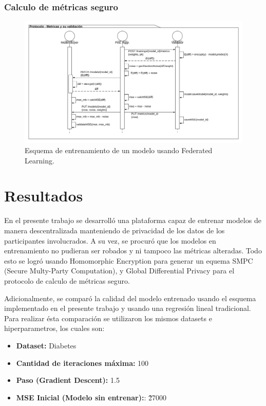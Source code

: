\documentclass[
11pt, %
oneside, %
spanish, %
singlespacing, %
parskip, %
headsepline, %
chapterinoneline, %
]{MastersDoctoralThesis} %
\begin{document}
\subsection*{Calculo de métricas seguro}
\begin{figure}[H]
  	\centering
	\includegraphics[scale=0.1]{imgs/flujo_valid.png}
	\caption{Esquema de entrenamiento de un modelo usando Federated Learning.}
	\label{fig:flujo_valid}
\end{figure}


\chapter{Resultados}

En el presente trabajo se desarrolló una plataforma capaz de entrenar modelos de manera descentralizada manteniendo de privacidad de los datos de los participantes involucrados. A su vez, se procuró que los modelos en entrenamiento no pudieran ser robados y ni tampoco las métricas alteradas. Todo esto se logró usando Homomorphic Encryption para generar un equema SMPC (Secure Multy-Party Computation), y Global Differential Privacy para el protocolo de calculo de métricas seguro.

Adicionalmente, se comparó la calidad del modelo entrenado usando el esquema implementado en el presente trabajo y usando una regresión lineal tradicional. Para realizar ésta comparación se utilizaron los mismos datasets e hiperparametros, los cuales son:


\begin{itemize}
\item \textbf{Dataset:} Diabetes\cite{dataset} 
\item \textbf{Cantidad de iteraciones máxima:} 100
\item \textbf{Paso (Gradient Descent):} 1.5
\item \textbf{MSE Inicial (Modelo sin entrenar):}: \~27000
\end{itemize}
\end{document}
